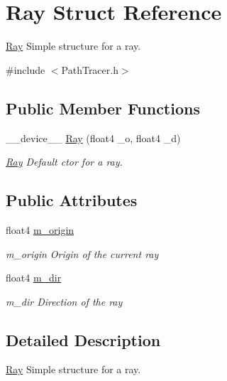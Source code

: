 \hypertarget{structRay}{\section{Ray Struct Reference}
\label{structRay}
}


\hyperlink{structRay}{Ray} Simple structure for a ray.  




{\ttfamily \#include $<$Path\-Tracer.\-h$>$}

\subsection*{Public Member Functions}
\begin{DoxyCompactItemize}
\item 
\-\_\-\-\_\-device\-\_\-\-\_\- \hyperlink{structRay_a66ef919841d94eafd0cd66974413dc4e}{Ray} (float4 \-\_\-o, float4 \-\_\-d)
\begin{DoxyCompactList}\small\item\em \hyperlink{structRay}{Ray} Default ctor for a ray. \end{DoxyCompactList}\end{DoxyCompactItemize}
\subsection*{Public Attributes}
\begin{DoxyCompactItemize}
\item 
\hypertarget{structRay_a6737aa9524fe3ff15ab2f52772477527}{float4 \hyperlink{structRay_a6737aa9524fe3ff15ab2f52772477527}{m\-\_\-origin}}\label{structRay_a6737aa9524fe3ff15ab2f52772477527}

\begin{DoxyCompactList}\small\item\em m\-\_\-origin Origin of the current ray \end{DoxyCompactList}\item 
\hypertarget{structRay_add4cc30ec7877e3e44713a21d189e4d1}{float4 \hyperlink{structRay_add4cc30ec7877e3e44713a21d189e4d1}{m\-\_\-dir}}\label{structRay_add4cc30ec7877e3e44713a21d189e4d1}

\begin{DoxyCompactList}\small\item\em m\-\_\-dir Direction of the ray \end{DoxyCompactList}\end{DoxyCompactItemize}


\subsection{Detailed Description}
\hyperlink{structRay}{Ray} Simple structure for a ray. 

